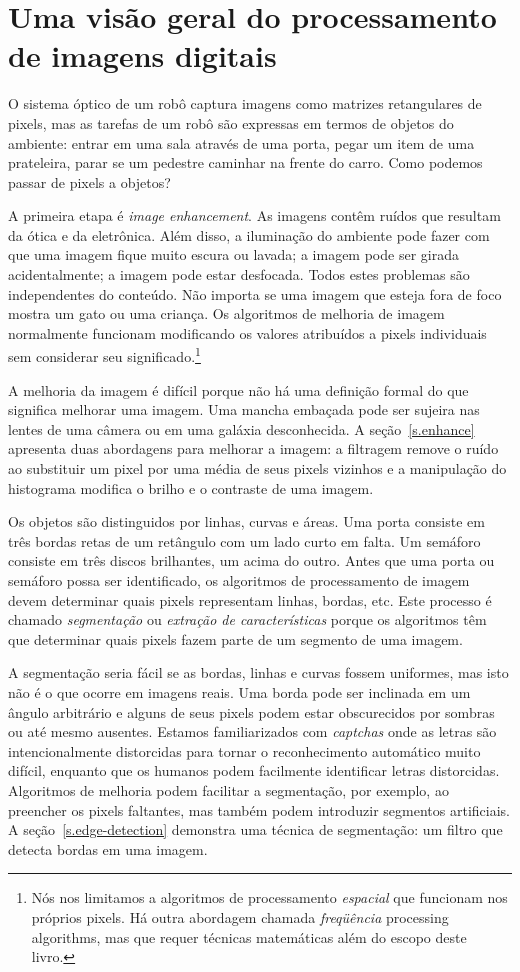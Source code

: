 \section{Uma visão geral do processamento de imagens digitais}\label{s.image-overview}

O sistema óptico de um robô captura imagens como matrizes retangulares de pixels, mas as tarefas de um robô são expressas em termos de objetos do ambiente: entrar em uma sala através de uma porta, pegar um item de uma prateleira, parar se um pedestre caminhar na frente do carro. Como podemos passar de pixels a objetos?

A primeira etapa é \emph{image enhancement}. As imagens contêm ruídos que resultam da ótica e da eletrônica. Além disso, a iluminação do ambiente pode fazer com que uma imagem fique muito escura ou lavada; a imagem pode ser girada acidentalmente; a imagem pode estar desfocada. Todos estes problemas são independentes do conteúdo. Não importa se uma imagem que esteja fora de foco mostra um gato ou uma criança. Os algoritmos de melhoria de imagem normalmente funcionam modificando os valores atribuídos a pixels individuais sem considerar seu significado.\footnote{Nós nos limitamos a algoritmos de processamento \emph{espacial} que funcionam nos próprios pixels. Há outra abordagem chamada \emph{freqüência} processing algorithms, mas que requer técnicas matemáticas além do escopo deste livro.}

A melhoria da imagem é difícil porque não há uma definição formal do que significa melhorar uma imagem. Uma mancha embaçada pode ser sujeira nas lentes de uma câmera ou em uma galáxia desconhecida. A seção~\ref{s.enhance} apresenta duas abordagens para melhorar a imagem: a filtragem remove o ruído ao substituir um pixel por uma média de seus pixels vizinhos e a manipulação do histograma modifica o brilho e o contraste de uma imagem.

Os objetos são distinguidos por linhas, curvas e áreas. Uma porta consiste em três bordas retas de um retângulo com um lado curto em falta. Um semáforo consiste em três discos brilhantes, um acima do outro. Antes que uma porta ou semáforo possa ser identificado, os algoritmos de processamento de imagem devem determinar quais pixels representam linhas, bordas, etc. Este processo é chamado \emph{segmentação} ou \emph{extração de características} porque os algoritmos têm que determinar quais pixels fazem parte de um segmento de uma imagem.

A segmentação seria fácil se as bordas, linhas e curvas fossem uniformes, mas isto não é o que ocorre em imagens reais. Uma borda pode ser inclinada em um ângulo arbitrário e alguns de seus pixels podem estar obscurecidos por sombras ou até mesmo ausentes. Estamos familiarizados com \emph{captchas} onde as letras são intencionalmente distorcidas para tornar o reconhecimento automático muito difícil, enquanto que os humanos podem facilmente identificar letras distorcidas. Algoritmos de melhoria podem facilitar a segmentação, por exemplo, ao preencher os pixels faltantes, mas também podem introduzir segmentos artificiais. A seção~\ref{s.edge-detection} demonstra uma técnica de segmentação: um filtro que detecta bordas em uma imagem.

